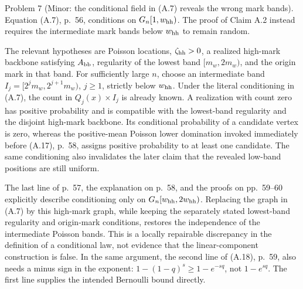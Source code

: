 \documentclass[10pt]{article}
\begin{document}
Problem 7 (Minor: the conditional field in (A.7) reveals the wrong mark bands).  Equation (A.7), p. 56, conditions on \(G_n[1,w_{\rm hh})\). The proof of Claim A.2 instead requires the intermediate mark bands below \(w_{\rm hh}\) to remain random.\par
The relevant hypotheses are Poisson locations, \(\zeta_{\rm hh}>0\), a realized high-mark backbone satisfying \(A_{\rm bb}\), regularity of the lowest band \([m_w,2m_w)\), and the origin mark in that band. For sufficiently large \(n\), choose an intermediate band \(I_j=[2^j m_w,2^{j+1}m_w)\), \(j\geq1\), strictly below \(w_{\rm hh}\). Under the literal conditioning in (A.7), the count in \(Q_j(x)\times I_j\) is already known. A realization with count zero has positive probability and is compatible with the lowest-band regularity and the disjoint high-mark backbone. Its conditional probability of a candidate vertex is zero, whereas the positive-mean Poisson lower domination invoked immediately before (A.17), p. 58, assigns positive probability to at least one candidate. The same conditioning also invalidates the later claim that the revealed low-band positions are still uniform.\par
The last line of p. 57, the explanation on p. 58, and the proofs on pp. 59–60 explicitly describe conditioning only on \(G_n[w_{\rm hh},2w_{\rm hh})\). Replacing the graph in (A.7) by this high-mark graph, while keeping the separately stated lowest-band regularity and origin-mark conditions, restores the independence of the intermediate Poisson bands. This is a locally repairable discrepancy in the definition of a conditional law, not evidence that the linear-component construction is false. In the same argument, the second line of (A.18), p. 59, also needs a minus sign in the exponent: \(1-(1-q)^s\geq1-e^{-sq}\), not \(1-e^{sq}\). The first line supplies the intended Bernoulli bound directly.\par
\end{document}
